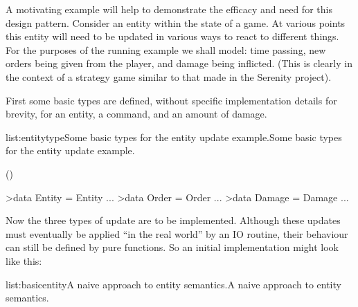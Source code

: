 A motivating example will help to demonstrate the efficacy and need for this design pattern. Consider an entity within the state of a game. At various points this entity will need to be updated in various ways to react to different things. For the purposes of the running example we shall model: time passing, new orders being given from the player, and damage being inflicted. (This is clearly in the context of a strategy game similar to that made in the Serenity project).

First some basic types are defined, without specific implementation details for brevity, for an entity, a command, and an amount of damage.

\vspace{-0.5em}
\begin{listing}{list:entitytype}{Some basic types for the entity update example.}{Some basic types for the entity update example.}{}
\end{listing}\vspace{-1.5em}

\functions()
\begin{haskell}

>data Entity = Entity {...}
>data Order = Order {...}
>data Damage = Damage {...}

\end{haskell}
\noindent Now the three types of update are to be implemented. Although these updates must eventually be applied ``in the real world'' by an IO routine, their behaviour can still be defined by pure functions. So an initial implementation might look like this:

\vspace{-0.5em}
\begin{listing}{list:basicentity}{A naive approach to entity semantics.}{A naive approach to entity semantics.}{}
\end{listing}\vspace{-1.5em}

